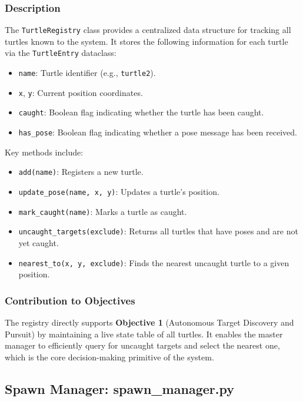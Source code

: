 \documentclass[12pt,a4paper]{article}
\begin{document}
\subsubsection{Description}

The \texttt{TurtleRegistry} class provides a centralized data structure for tracking all turtles known to the system. It stores the following information for each turtle via the \texttt{TurtleEntry} dataclass:

\begin{itemize}
  \item \texttt{name}: Turtle identifier (e.g., \texttt{turtle2}).
  \item \texttt{x}, \texttt{y}: Current position coordinates.
  \item \texttt{caught}: Boolean flag indicating whether the turtle has been caught.
  \item \texttt{has\_pose}: Boolean flag indicating whether a pose message has been received.
\end{itemize}

Key methods include:
\begin{itemize}
  \item \texttt{add(name)}: Registers a new turtle.
  \item \texttt{update\_pose(name, x, y)}: Updates a turtle's position.
  \item \texttt{mark\_caught(name)}: Marks a turtle as caught.
  \item \texttt{uncaught\_targets(exclude)}: Returns all turtles that have poses and are not yet caught.
  \item \texttt{nearest\_to(x, y, exclude)}: Finds the nearest uncaught turtle to a given position.
\end{itemize}

\subsubsection{Contribution to Objectives}

The registry directly supports \textbf{Objective 1} (Autonomous Target Discovery and Pursuit) by maintaining a live state table of all turtles. It enables the master manager to efficiently query for uncaught targets and select the nearest one, which is the core decision-making primitive of the system.

\subsection{Spawn Manager: spawn\_manager.py}
\label{subsec:spawn}
\end{document}
